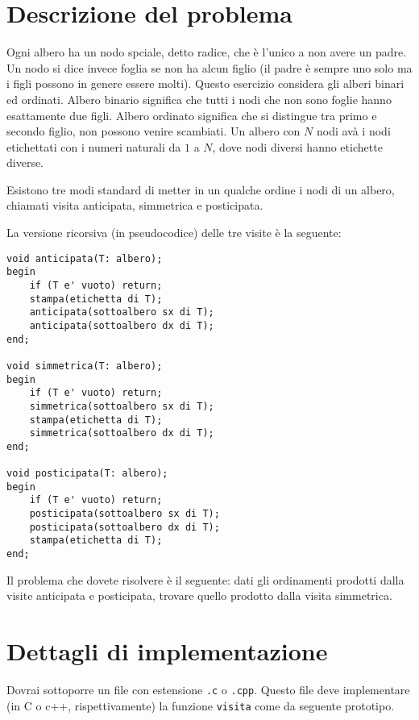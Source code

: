 \documentclass[a4paper,11pt]{article}
\newcommand{\gara}{OII 2003}
\newcommand{\nome}{Alberi}
\newcommand{\nomebreve}{alberi}
\begin{document}
\noindent{\Large \gara}
\vspace{0.5cm}

\noindent{\Huge \textbf \nome~(\texttt{\nomebreve})}

\section*{Descrizione del problema}

Ogni albero ha un nodo spciale, detto radice, che è l'unico a non avere un padre. Un nodo si dice invece foglia se non ha alcun figlio (il padre è sempre uno solo ma i figli possono in genere essere molti).
Questo esercizio considera gli alberi binari ed ordinati.
Albero binario significa che tutti i nodi che non sono foglie hanno esattamente due figli. Albero ordinato significa che si distingue tra primo e secondo figlio, non possono venire scambiati.
Un albero con $N$ nodi av\`a i nodi etichettati con i numeri naturali da $1$ a $N$, dove nodi diversi hanno etichette diverse.

Esistono tre modi standard di metter in un qualche ordine i nodi di un albero, chiamati visita anticipata, simmetrica e posticipata.

La versione ricorsiva (in pseudocodice) delle tre visite è la seguente:

\begin{verbatim}
void anticipata(T: albero);
begin
    if (T e' vuoto) return;
    stampa(etichetta di T);
    anticipata(sottoalbero sx di T);
    anticipata(sottoalbero dx di T);
end;

void simmetrica(T: albero);
begin
    if (T e' vuoto) return;
    simmetrica(sottoalbero sx di T);
    stampa(etichetta di T);
    simmetrica(sottoalbero dx di T);
end;

void posticipata(T: albero);
begin
    if (T e' vuoto) return;
    posticipata(sottoalbero sx di T);
    posticipata(sottoalbero dx di T);
    stampa(etichetta di T);
end;
\end{verbatim}


Il problema che dovete risolvere è il seguente: dati gli ordinamenti prodotti dalla visite anticipata e posticipata, trovare quello prodotto dalla visita simmetrica.


\section*{Dettagli di implementazione}
Dovrai sottoporre un file con estensione \texttt{.c} o
\texttt{.cpp}. Questo file deve implementare (in C o c++, rispettivamente)
la funzione \texttt{visita} come da seguente prototipo.
\end{document}
